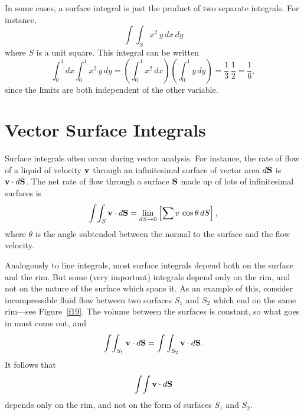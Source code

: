 In some cases, a surface integral is just the product of two separate integrals.
For instance, 
\begin{equation}
\int\int_S x^2 \,y\,dx\,dy
\end{equation}
where $S$ is a unit square. This integral can be written
\begin{equation}
\int_0^1 dx \int_0^1 x^2 \,y\,dy = \left(\int_0^1 x^2\,dx\right)
\left(\int_0^1 y \,dy\right) = \frac{1}{3}\,\frac{1}{2} = \frac{1}{6},
\end{equation}
since the limits are both independent of the other variable. 

\section{Vector Surface Integrals}
Surface integrals often occur during vector analysis. For instance, the rate of
flow of a liquid of velocity ${\bf v}$ through an infinitesimal
 surface of vector area $d{\bf S}$
is ${\bf v} \cdot d{\bf S}$. The net rate of flow through a surface ${\bf S}$ made up
of
lots of infinitesimal surfaces is 
\begin{equation}
\int\!\int_S {\bf v}\cdot d{\bf S} = \lim_{dS\rightarrow 0}\left[ \sum v\,\cos\theta
\,dS\right],
\end{equation}
where $\theta$ is the angle subtended between the normal to the surface and the
flow velocity. 

Analogously to line integrals, most 
surface  integrals depend both on the surface and the rim.
But some (very important) integrals depend only on the rim, and not on the nature
of the surface which spans it. As an example of this, consider incompressible fluid
flow between two surfaces $S_1$ and $S_2$ which end on the same rim---see Figure~\ref{f19}. 
The volume between the surfaces is constant, so what goes in must come out, and
\begin{equation}
\int\!\int_{S_1} {\bf v}\cdot d{\bf S} = \int\int_{S_2} {\bf v}\cdot d{\bf S}.
\end{equation}
It follows that
\begin{equation}
\int\!\int {\bf v}\cdot d{\bf S} 
\end{equation}
depends only on the rim, and not on the form of surfaces $S_1$ and $S_2$. 

